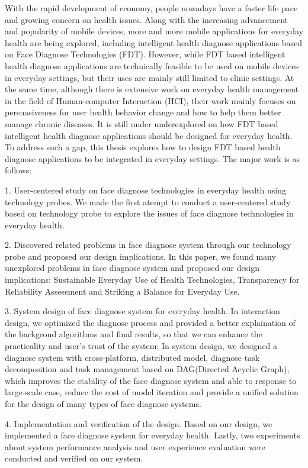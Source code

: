 \documentclass[oneside,type=master]{fduthesis}
\begin{document}
\begin{abstract*}

With the rapid development of economy, people nowadays have a faster life pace and growing concern on health issues. 
Along with the increasing advancement and popularity of mobile devices, more and more mobile applications for everyday health are being explored, including intelligent health diagnose applications based on Face Diagnose Technologies (FDT). However, while FDT based intelligent health diagnose applications are technically feasible to be used on mobile devices in everyday settings, but their uses are mainly still limited to clinic settings. At the same time, although there is extensive work on everyday health management in the field of Human-computer Interaction (HCI), their work mainly focuses on persuasiveness for user health behavior change and how to help them better manage chronic diseases. It is still under underexplored on how FDT based intelligent health diagnose applications should be designed for everyday health.
To address such a gap, this thesis explores how to design FDT based health diagnose applications to be integrated in everyday settings. The major work is as follows: 

1. User-centered study on face diagnose technologies in everyday health using technology probes.
We made the first atempt to conduct a user-centered study based on technology probe to explore the issues of face diagnose technologies in everyday health.

2. Discovered related problems in face diagnose system through our technology probe and proposed our design implications.
In this paper, we found many unexplored problems in face diagnose system and proposed our design implications: Sustainable Everyday Use of Health Technologies, Transparency for Reliability Assessment and Striking a Balance for Everyday Use. 

3. System design of face diagnose system for everyday health.
In interaction design, we optimized the diagnose process and provided a better explaination of the backgroud algorithms and final results, so that we can enhance the practicality and user's trust of the system;
In system design, we designed a diagnose system with cross-platform, distributed model, diagnose task decomposition and task management based on DAG(Directed Acyclic Graph), which improves the stability of the face diagnose system and able to response to large-scale case, reduce the cost of model iteration and provide a unified solution for the design of many types of face diagnose systems.

4. Implementation and verification of the design.
Based on our design, we implemented a face diagnose system for everyday health. Lastly, two experiments about system performance analysis and user experience evaluation were conducted and verified on our system.


\end{abstract*}
\end{document}
